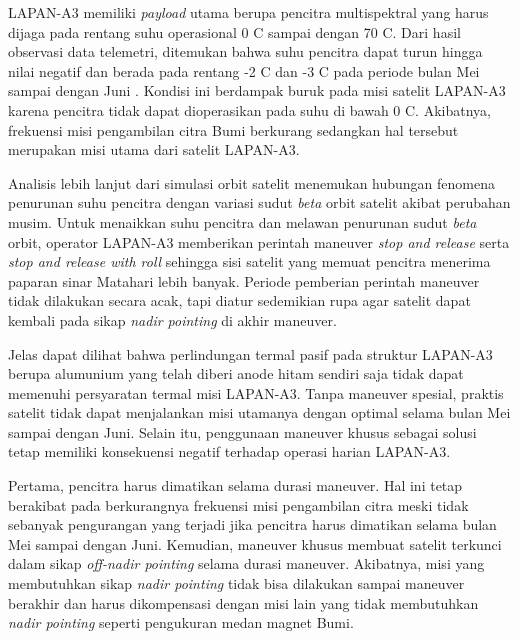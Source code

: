 LAPAN-A3 memiliki \textit{payload} utama berupa pencitra multispektral yang
harus dijaga pada rentang suhu operasional 0 \degree C sampai dengan 70 \degree
C. Dari hasil observasi data telemetri, ditemukan bahwa suhu pencitra dapat
turun hingga nilai negatif dan berada pada rentang -2 \degree C dan -3 \degree
C pada periode bulan Mei sampai dengan Juni \cite{ribah2019}. Kondisi ini
berdampak buruk pada misi satelit LAPAN-A3 karena pencitra tidak dapat
dioperasikan pada suhu di bawah 0 \degree C. Akibatnya, frekuensi misi
pengambilan citra Bumi berkurang sedangkan hal tersebut merupakan misi utama
dari satelit LAPAN-A3.

Analisis lebih lanjut dari simulasi orbit satelit menemukan hubungan fenomena
penurunan suhu pencitra dengan variasi sudut \textit{beta} orbit satelit akibat
perubahan musim. Untuk menaikkan suhu pencitra dan melawan penurunan sudut
\textit{beta} orbit, operator LAPAN-A3 memberikan perintah maneuver
\textit{stop and release} serta \textit{stop and release with roll} sehingga
sisi satelit yang memuat pencitra menerima paparan sinar Matahari lebih banyak.
Periode pemberian perintah maneuver tidak dilakukan secara acak, tapi diatur
sedemikian rupa agar satelit dapat kembali pada sikap \textit{nadir pointing}
di akhir maneuver.

Jelas dapat dilihat bahwa perlindungan termal pasif pada struktur LAPAN-A3
berupa alumunium yang telah diberi anode hitam sendiri saja tidak dapat
memenuhi persyaratan termal misi LAPAN-A3. Tanpa maneuver spesial, praktis
satelit tidak dapat menjalankan misi utamanya dengan optimal selama bulan Mei
sampai dengan Juni. Selain itu, penggunaan maneuver khusus sebagai solusi tetap
memiliki konsekuensi negatif terhadap operasi harian LAPAN-A3. 

Pertama, pencitra harus dimatikan selama durasi maneuver. Hal ini tetap
berakibat pada berkurangnya frekuensi misi pengambilan citra meski tidak
sebanyak pengurangan yang terjadi jika pencitra harus dimatikan selama bulan
Mei sampai dengan Juni. Kemudian, maneuver khusus membuat satelit terkunci
dalam sikap \textit{off-nadir pointing} selama durasi maneuver. Akibatnya, misi
yang membutuhkan sikap \textit{nadir pointing} tidak bisa dilakukan sampai
maneuver berakhir dan harus dikompensasi dengan misi lain yang tidak
membutuhkan \textit{nadir pointing} seperti pengukuran medan magnet Bumi.

